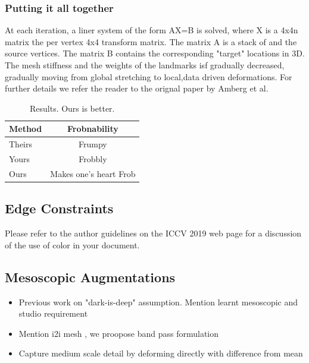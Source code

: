 \documentclass[10pt,twocolumn,letterpaper]{article}
\begin{document}
 \subsubsection{Putting it all together}
 
 
 At each iteration, a liner system of the form AX=B is solved, where X is a 4x4n matrix the per vertex 4x4 transform matrix. The matrix A is a stack of  and the source vertices. The matrix B contains the corresponding "target" locations in 3D. The mesh stiffness and the weights of the landmarks isf gradually decreased, gradually moving from global stretching to local,data driven deformations. For further details we refer the reader to the orignal paper by Amberg et al. 

\begin{table}
\begin{center}
\begin{tabular}{|l|c|}
\hline
Method & Frobnability \\
\hline\hline
Theirs & Frumpy \\
Yours & Frobbly \\
Ours & Makes one's heart Frob\\
\hline
\end{tabular}
\end{center}
\caption{Results.   Ours is better.}
\end{table}

\subsection{Edge Constraints}

Please refer to the author guidelines on the ICCV 2019 web page for a discussion
of the use of color in your document.




\subsection{Mesoscopic Augmentations}

\begin{itemize}
    \item Previous work on "dark-is-deep" assumption. Mention learnt mesoscopic and studio requirement
    \item Mention i2i mesh , we proopose band pass formulation 
    \item Capture medium scale detail by deforming directly with difference from mean
\end{itemize}
\end{document}
